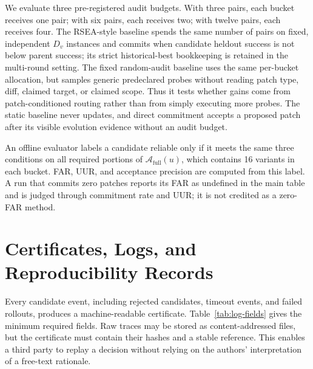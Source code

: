 \documentclass{article}
\begin{document}
We evaluate three pre-registered audit budgets. With three pairs, each bucket receives one pair; with six pairs, each receives two; with twelve pairs, each receives four. The RSEA-style baseline spends the same number of pairs on fixed, independent $D_v$ instances and commits when candidate heldout success is not below parent success; its strict historical-best bookkeeping is retained in the multi-round setting. The fixed random-audit baseline uses the same per-bucket allocation, but samples generic predeclared probes without reading patch type, diff, claimed target, or claimed scope. Thus it tests whether gains come from patch-conditioned routing rather than from simply executing more probes. The static baseline never updates, and direct commitment accepts a proposed patch after its visible evolution evidence without an audit budget.

An offline evaluator labels a candidate reliable only if it meets the same three conditions on all required portions of $\mathcal{A}_{\mathrm{full}}(u)$, which contains 16 variants in each bucket. FAR, UUR, and acceptance precision are computed from this label. A run that commits zero patches reports its FAR as undefined in the main table and is judged through commitment rate and UUR; it is not credited as a zero-FAR method.

\section{Certificates, Logs, and Reproducibility Records}
\label{app:logs}

Every candidate event, including rejected candidates, timeout events, and failed rollouts, produces a machine-readable certificate. Table~\ref{tab:log-fields} gives the minimum required fields. Raw traces may be stored as content-addressed files, but the certificate must contain their hashes and a stable reference. This enables a third party to replay a decision without relying on the authors' interpretation of a free-text rationale.
\end{document}
